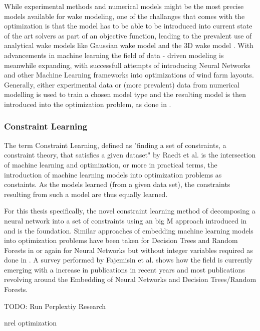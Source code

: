While experimental methods and numerical models might be the most precise models available for wake modeling, one of the challanges that comes with the optimization is that the model has to be able to be introduced into current state of the art solvers as part of an objective function, leading to the prevalent use of analytical wake models like Gaussian wake model and the 3D wake model  \cite{WANG2024118508}. With advancements in machine learning the field of data - driven modeling is meanwhile expanding, with successfull attempts of introducing Neural Networks and other Machine Learning frameworks into optimizations of wind farm layouts. Generally, either experimental data or (more prevalent) data from numerical modelling is used to train  a chosen model type and the resulting model is then introduced into the optimization problem, as done in \cite{YANG2023119240} \cite{wes-9-869-2024} \cite{TI2020114025} \cite{TI2021618}. 

\subsubsection{Constraint Learning}

The term Constraint Learning, defined as "finding a set of constraints, a constraint theory, that satisfies a given dataset" by Raedt et al. is the intersection of machine learning and optimization, or more in practical terms, the introduction of machine learning models into optimization problems as constaints. As the models learned (from a given data set), the constraints resulting from such a model are thus equally learned. \cite{de2018learning} 

For this thesis specifically, the novel constraint learning method of decomposing a neural network into a set of constraints using an big M approach introduced in \cite{ALCANTARA2023120895} and \cite{ALCANTARA2025127876} is the foundation. Similar approaches of embedding machine learning models into optimization problems have been taken for Decision Trees and Random Forests in \cite{preprintBonfiettiEmbeddDecisionTrees} or again for Neural Networks but without integer variables required as done in \cite{dealba2024reformulationembeddingneuralnetwork}. A survey performed by Fajemisin et al.\cite{FAJEMISIN20241} shows how the field is currently emerging with a increase in publications in recent years and most publications revolving around the Embedding of Neural Networks and Decision Trees/Random Forests.




TODO: Run Perplextiy Research

nrel optimization